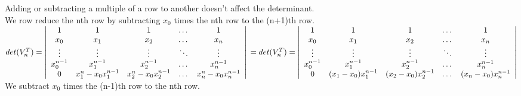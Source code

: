 \documentclass[12pt]{article}
\newenvironment{problems}{\begin{list}{}{\setlength{\labelwidth}{.7in}}}{\end{list}}
\begin{document}
\begin{problems}
  Adding or subtracting a multiple of a row to another doesn't affect the determinant.\\
  We row reduce the nth row by subtracting $x_0$ times the nth row to the (n+1)th row.\\
  
 $det(V_n^T) = \left|  \begin{array}{ccccc}
   1           &  1           & 1          & \dots      & 1         \\
   x_0         &  x_1         & x_2      & \dots      & x_n     \\
   \vdots      &  \vdots      & \vdots     & \ddots     & \vdots    \\
   x_0^{n-1}   &  x_1^{n-1}   & x_2^{n-1}  & \dots      & x_n^{n-1} \\
   0           &  x_1^n - x_0x_1^{n-1}       & x_2^n - x_0x_2^{n-1}     & \dots &x_n^n - x_0x_n^{n-1}      \\
  \end{array}           \right|\\
   = 
 det(V_n^T) = \left|  \begin{array}{ccccc}
   1           &  1           & 1          & \dots      & 1         \\
   x_0         &  x_1         & x_2      & \dots      & x_n     \\
   \vdots      &  \vdots      & \vdots     & \ddots     & \vdots    \\
   x_0^{n-1}   &  x_1^{n-1}   & x_2^{n-1}  & \dots      & x_n^{n-1} \\
   0           &  (x_1 - x_0)x_1^{n-1}       & (x_2 - x_0)x_2^{n-1}     & \dots &(x_n - x_0)x_n^{n-1}      \\
  \end{array}           \right|$\\  

We subtract $x_0$ times the (n-1)th row to the nth row.\\


\end{problems}
\end{document}
